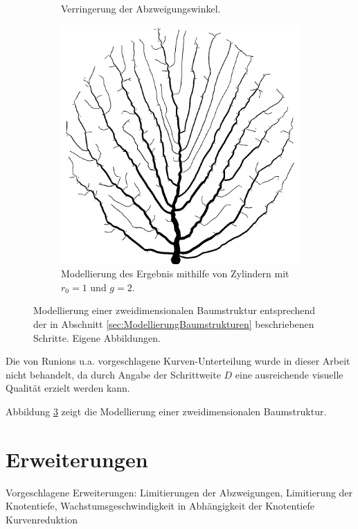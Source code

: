 \begin{figure} [hbtp]
\begin{subfigure}[t]{.35\textwidth}
		\caption{Verringerung der Abzweigungswinkel.}
		\label{subfig:SCA_Extended3}
	\end{subfigure}
	\hspace{.1\textwidth}
	\begin{subfigure}[t]{.35\textwidth}
		\centering
		\includegraphics[width=\linewidth]{images/SCA_Extended4.png}
		\caption{Modellierung des Ergebnis mithilfe von Zylindern mit $r_0 = 1$ und $g=2$.}
		\label{subfig:SCA_Extended4}
	\end{subfigure}
	\caption{Modellierung einer zweidimensionalen Baumstruktur entsprechend der in Abschnitt \ref{sec:ModellierungBaumstrukturen} beschriebenen Schritte.  Eigene Abbildungen.}
	\label{fig:SCA_Extended}
\end{figure}

Die von Runions u.a. \cite{SpaceColonizationAlgorithm:07} vorgeschlagene Kurven-Unterteilung \cite[Abschn. 2]{SpaceColonizationAlgorithm:07} wurde in dieser Arbeit nicht behandelt, da durch Angabe der Schrittweite $D$ eine ausreichende visuelle Qualität erzielt werden kann.

Abbildung \ref{fig:SCA_Extended} zeigt die Modellierung einer zweidimensionalen Baumstruktur.

\section{Erweiterungen}


Vorgeschlagene Erweiterungen: Limitierungen der Abzweigungen, Limitierung der Knotentiefe, Wachstumsgeschwindigkeit in Abhängigkeit der Knotentiefe
Kurvenreduktion
